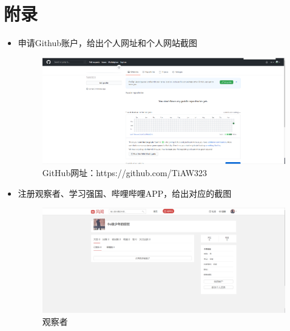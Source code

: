 \documentclass{article}
\begin{document}
\section{附录}
\begin{itemize}
    \item 申请Github账户，给出个人网址和个人网站截图
    \begin{figure}[h!]
    	\centering
    	\includegraphics[scale=0.2]{GitHub}
    	\caption{GitHub网址：https://github.com/TiAW323}
    	\label{fig:github}
    \end{figure}
    \item 注册观察者、学习强国、哔哩哔哩APP，给出对应的截图
    \begin{figure}[h!]
    	\centering
    	\includegraphics[scale=0.2]{观察者}
    	\caption{观察者}
    	\label{fig:github}
    \end{figure}




\end{itemize}
\end{document}
